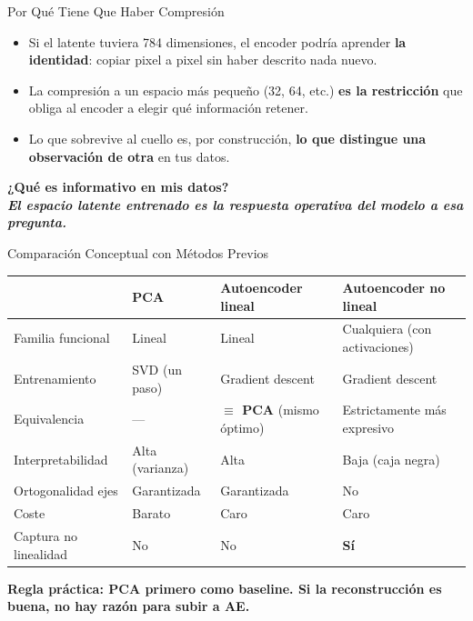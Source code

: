 \documentclass[aspectratio=169, 11pt]{beamer}
\begin{document}
\begin{frame}[shrink]{Por Qué Tiene Que Haber Compresión}
  \vspace{8pt}
  \begin{itemize}\setlength\itemsep{6pt}
    \item Si el latente tuviera 784 dimensiones, el encoder podría aprender \textbf{la identidad}: copiar pixel a pixel sin haber descrito nada nuevo.
    \item La compresión a un espacio más pequeño (32, 64, etc.) \textbf{es la restricción} que obliga al encoder a elegir qué información retener.
    \item Lo que sobrevive al cuello es, por construcción, \textbf{lo que distingue una observación de otra} en tus datos.
  \end{itemize}
  \vspace{10pt}
  \begin{center}
  {\color{arcaDark}\bfseries\Large
  ¿Qué es informativo en mis datos?\\[4pt]
  \normalsize\color{textMuted}\itshape El espacio latente entrenado es la respuesta operativa del modelo a esa pregunta.}
  \end{center}
\end{frame}

\begin{frame}[shrink]{Comparación Conceptual con Métodos Previos}
  \vspace{6pt}
  {\footnotesize
  \begin{tabular}{@{}p{2.6cm} p{3.0cm} p{3.0cm} p{4.0cm}@{}}
    \toprule
    \rowcolor{arcaLightGray}
     & \textbf{PCA} & \textbf{Autoencoder lineal} & \textbf{Autoencoder no lineal} \\
    \midrule
    Familia funcional & Lineal & Lineal & Cualquiera (con activaciones) \\
    Entrenamiento & SVD (un paso) & Gradient descent & Gradient descent \\
    Equivalencia & --- & \textbf{$\equiv$ PCA} (mismo óptimo) & Estrictamente más expresivo \\
    Interpretabilidad & Alta (varianza) & Alta & Baja (caja negra) \\
    Ortogonalidad ejes & Garantizada & Garantizada & No \\
    Coste & Barato & Caro & Caro \\
    Captura no linealidad & No & No & \textbf{Sí} \\
    \bottomrule
  \end{tabular}}
  \vspace{14pt}
  {\footnotesize\color{arcaDark}\bfseries
  Regla práctica: PCA primero como baseline. Si la reconstrucción es buena, no hay razón para subir a AE.}
\end{frame}
\end{document}
